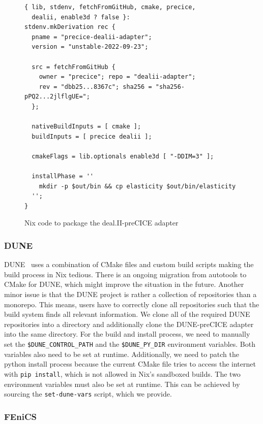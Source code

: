 \documentclass{eceasst}
\begin{document}
\begin{figure}
    \normalsize
    \begin{verbatim}
{ lib, stdenv, fetchFromGitHub, cmake, precice,
  dealii, enable3d ? false }:
stdenv.mkDerivation rec {
  pname = "precice-dealii-adapter";
  version = "unstable-2022-09-23";

  src = fetchFromGitHub {
    owner = "precice"; repo = "dealii-adapter";
    rev = "dbb25...8367c"; sha256 = "sha256-pPQ2...2jlflgUE=";
  };

  nativeBuildInputs = [ cmake ];
  buildInputs = [ precice dealii ];

  cmakeFlags = lib.optionals enable3d [ "-DDIM=3" ];

  installPhase = ''
    mkdir -p $out/bin && cp elasticity $out/bin/elasticity
  '';
}
    \end{verbatim}
    \caption{Nix code to package the deal.II-preCICE adapter}
    \label{lst:dealii-adapter-nix}
\end{figure}

\subsubsection{DUNE}

DUNE~\cite{bastian2020dune} uses a combination of CMake files and custom build scripts making the build process in Nix tedious.
There is an ongoing migration from autotools to CMake for DUNE, which might improve the situation in the future.
Another minor issue is that the DUNE project is rather a collection of repositories than a monorepo. This means, users have to correctly clone all repositories such that the build system finds all relevant information.
We clone all of the required DUNE repositories into a directory and additionally clone the DUNE-preCICE adapter into the same directory.
For the build and install process, we need to manually set the \texttt{\$DUNE\_CONTROL\_PATH} and the \texttt{\$DUNE\_PY\_DIR} environment variables. Both variables also need to be set at runtime.
Additionally, we need to patch the python install process because the current CMake file tries to access the internet with \texttt{pip install}, which is not allowed in Nix's sandboxed builds.
The two environment variables must also be set at runtime.
This can be achieved by sourcing the \texttt{set-dune-vars} script, which we provide.

\subsubsection{FEniCS}
\end{document}
